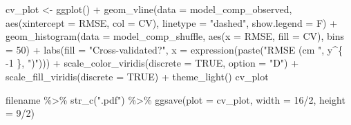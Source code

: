 \documentclass[12pt]{article}
\newenvironment{Shaded}{\begin{snugshade}}{\end{snugshade}}
\newcommand{\AttributeTok}[1]{\textcolor[rgb]{0.77,0.63,0.00}{#1}}
\newcommand{\ConstantTok}[1]{\textcolor[rgb]{0.00,0.00,0.00}{#1}}
\newcommand{\DecValTok}[1]{\textcolor[rgb]{0.00,0.00,0.81}{#1}}
\newcommand{\FunctionTok}[1]{\textcolor[rgb]{0.00,0.00,0.00}{#1}}
\newcommand{\NormalTok}[1]{#1}
\newcommand{\OtherTok}[1]{\textcolor[rgb]{0.56,0.35,0.01}{#1}}
\newcommand{\SpecialCharTok}[1]{\textcolor[rgb]{0.00,0.00,0.00}{#1}}
\newcommand{\StringTok}[1]{\textcolor[rgb]{0.31,0.60,0.02}{#1}}
\begin{document}
\begin{Shaded}
\begin{Highlighting}[]
\NormalTok{cv\_plot }\OtherTok{\textless{}{-}} \FunctionTok{ggplot}\NormalTok{() }\SpecialCharTok{+} \FunctionTok{geom\_vline}\NormalTok{(}\AttributeTok{data =}\NormalTok{ model\_comp\_observed, }\FunctionTok{aes}\NormalTok{(}\AttributeTok{xintercept =}\NormalTok{ RMSE,}
    \AttributeTok{col =}\NormalTok{ CV), }\AttributeTok{linetype =} \StringTok{"dashed"}\NormalTok{, }\AttributeTok{show.legend =}\NormalTok{ F) }\SpecialCharTok{+} \FunctionTok{geom\_histogram}\NormalTok{(}\AttributeTok{data =}\NormalTok{ model\_comp\_shuffle,}
    \FunctionTok{aes}\NormalTok{(}\AttributeTok{x =}\NormalTok{ RMSE, }\AttributeTok{fill =}\NormalTok{ CV), }\AttributeTok{bins =} \DecValTok{50}\NormalTok{) }\SpecialCharTok{+} \FunctionTok{labs}\NormalTok{(}\AttributeTok{fill =} \StringTok{"Cross{-}validated?"}\NormalTok{,}
    \AttributeTok{x =} \FunctionTok{expression}\NormalTok{(}\FunctionTok{paste}\NormalTok{(}\StringTok{"RMSE (cm "}\NormalTok{, y}\SpecialCharTok{\^{}}\NormalTok{\{}
        \SpecialCharTok{{-}}\DecValTok{1}
\NormalTok{    \}, }\StringTok{")"}\NormalTok{))) }\SpecialCharTok{+} \FunctionTok{scale\_color\_viridis}\NormalTok{(}\AttributeTok{discrete =} \ConstantTok{TRUE}\NormalTok{, }\AttributeTok{option =} \StringTok{"D"}\NormalTok{) }\SpecialCharTok{+} \FunctionTok{scale\_fill\_viridis}\NormalTok{(}\AttributeTok{discrete =} \ConstantTok{TRUE}\NormalTok{) }\SpecialCharTok{+}
    \FunctionTok{theme\_light}\NormalTok{()}
\NormalTok{cv\_plot}

\NormalTok{filename }\SpecialCharTok{\%\textgreater{}\%}
    \FunctionTok{str\_c}\NormalTok{(}\StringTok{".pdf"}\NormalTok{) }\SpecialCharTok{\%\textgreater{}\%}
    \FunctionTok{ggsave}\NormalTok{(}\AttributeTok{plot =}\NormalTok{ cv\_plot, }\AttributeTok{width =} \DecValTok{16}\SpecialCharTok{/}\DecValTok{2}\NormalTok{, }\AttributeTok{height =} \DecValTok{9}\SpecialCharTok{/}\DecValTok{2}\NormalTok{)}
\end{Highlighting}
\end{Shaded}




\end{document}
